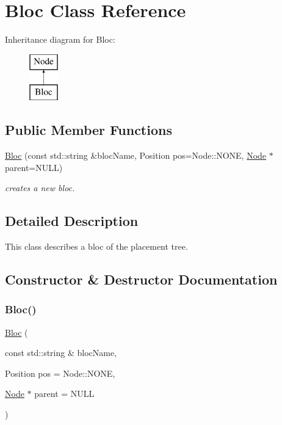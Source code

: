 \hypertarget{class_open_chams_1_1_bloc}{}\section{Bloc Class Reference}
\label{class_open_chams_1_1_bloc}
Inheritance diagram for Bloc\+:\begin{figure}[H]
\begin{center}
\leavevmode
\includegraphics[height=2.000000cm]{class_open_chams_1_1_bloc}
\end{center}
\end{figure}
\subsection*{Public Member Functions}
\begin{DoxyCompactItemize}
\item 
\hyperlink{class_open_chams_1_1_bloc_a06a4a848ddb493d0026abe2b307aa94a}{Bloc} (const std\+::string \&bloc\+Name, Position pos=Node\+::\+N\+O\+NE, \hyperlink{class_open_chams_1_1_node}{Node} $\ast$parent=N\+U\+LL)
\begin{DoxyCompactList}\small\item\em creates a new bloc. \end{DoxyCompactList}\end{DoxyCompactItemize}


\subsection{Detailed Description}
This class describes a bloc of the placement tree. 

\subsection{Constructor \& Destructor Documentation}
\mbox{\label{class_open_chams_1_1_bloc_a06a4a848ddb493d0026abe2b307aa94a}} 
\subsubsection{\texorpdfstring{Bloc()}{Bloc()}}
{\footnotesize\ttfamily \hyperlink{class_open_chams_1_1_bloc}{Bloc} (\begin{DoxyParamCaption}\item[{const std\+::string \&}]{bloc\+Name,  }\item[{Position}]{pos = {\ttfamily Node\+:\+:NONE},  }\item[{\hyperlink{class_open_chams_1_1_node}{Node} $\ast$}]{parent = {\ttfamily NULL} }\end{DoxyParamCaption})}



